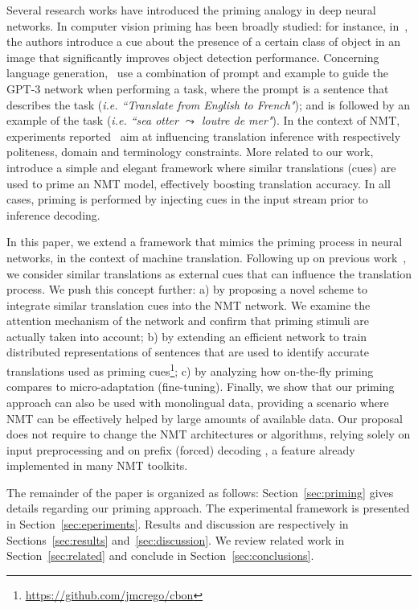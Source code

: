 Several research works have introduced the priming analogy in deep neural networks.
%
In computer vision priming has been broadly studied: for instance, in~\citet{Rosenfeld18Priming}, the authors introduce a cue about the presence of a certain class of object in an image that significantly improves object detection performance.
%
Concerning language generation, \citet{Brown20language}~use a combination of prompt and example to guide the GPT-3 network when performing a task, where the prompt is a sentence that describes the task ({\it i.e. ``Translate from English to French"}); and is followed by an example of the task ({\it i.e. ``sea otter $\leadsto$ loutre de mer"}).
%
In the context of NMT, experiments reported~\cite{Sennrich16politeness,Kobus17domain,dinu-etal-2019-training} aim at influencing translation inference with respectively politeness, domain and terminology constraints.
%
More related to our work,~\cite{bulte19neural,xu20boosting} introduce a simple and elegant framework where similar translations (cues) are used to prime an NMT model, effectively boosting translation accuracy.
In all cases, priming is performed by injecting cues in the input stream prior to inference decoding.

In this paper, we extend a framework that mimics the priming process in neural networks, in the context of machine translation. 
Following up on previous work~\cite{bulte19neural,xu20boosting}, we consider similar translations as external cues that can influence the translation process. We push this concept further:
a) by proposing a novel scheme to integrate similar translation cues into the NMT network. We examine the attention mechanism of the network and confirm that priming stimuli are actually taken into account;
b) by extending an efficient network to train distributed representations of sentences
that are used to identify accurate translations used as priming cues\footnote{\url{https://github.com/jmcrego/cbon}}; 
c) by analyzing how on-the-fly priming compares to micro-adaptation (fine-tuning). 
%
Finally, we show that our priming approach can also be used with monolingual data, providing a scenario where NMT can be effectively helped by large amounts of available data.
%
Our proposal does not require to change the NMT architectures or algorithms, relying solely on input preprocessing and on prefix (forced) decoding \cite{santy19inmt,rebecca16neural}, a feature already implemented in many NMT toolkits.

The remainder of the paper is organized as follows: Section~\ref{sec:priming} gives details regarding our priming approach. The experimental framework is presented in Section~\ref{sec:eperiments}. Results and discussion are respectively in Sections~\ref{sec:results} and~\ref{sec:discussion}. We review related work in Section~\ref{sec:related} and conclude in Section~\ref{sec:conclusions}.

